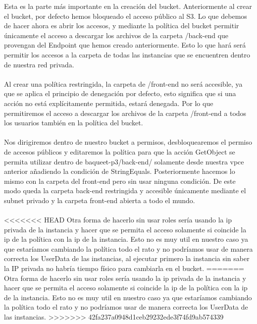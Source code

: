 \documentclass{article}
\begin{document}
	Esta es la parte más importante en la creación del bucket. Anteriormente al crear el bucket, por defecto hemos bloqueado el acceso público al S3. Lo que debemos de hacer ahora es abrir los accesos, y mediante la política del bucket permitir únicamente el acceso a descargar los archivos de la carpeta /back-end que provengan del Endpoint que hemos creado anteriormente. Esto lo que hará será permitir los accesos a la carpeta de todas las instancias que se encuentren dentro de nuestra red privada. 
	\\\\
	Al crear una política restringida, la carpeta de /front-end no será accesible, ya que se aplica el principio de denegación por defecto, esto significa que si una acción no está explícitamente permitida, estará denegada. Por lo que permitiremos el acceso a descargar los archivos de la carpeta /front-end a todos los usuarios también en la política del bucket.
	\\\\
	Nos dirigiremos dentro de nuestro bucket a permisos, desbloquearemos el permiso de accesos públicos y editaremos la política para que la acción GetObject se permita utilizar dentro de baqueet-p3/back-end/ solamente desde nuestra vpce anterior añadiendo la condición de StringEquals. Posteriormente hacemos lo mismo con la carpeta del front-end pero sin usar ninguna condición. De este modo queda la carpeta back-end restringida y accesible únicamente mediante el subnet privado y la carpeta front-end abierta a todo el mundo.
	\\\\
<<<<<<< HEAD
	Otra forma de hacerlo sin usar roles sería usando la ip privada de la instancia y hacer que se permita el acceso solamente si coincide la ip de la política con la ip de la instancia. Esto no es muy util en nuestro caso ya que estaríamos cambiando la política todo el rato y no podríamos usar de manera correcta los UserData de las instancias, al ejecutar primero la instancia sin saber la IP privada no habría tiempo físico para cambiarla en el bucket. 
=======
	Otra forma de hacerlo sin usar roles sería usando la ip privada de la instancia y hacer que se permita el acceso solamente si coincide la ip de la política con la ip de la instancia. Esto no es muy util en nuestro caso ya que estaríamos cambiando la política todo el rato y no podríamos usar de manera correcta los UserData de las instancias.
>>>>>>> 42fa237a0948d1ceb29232ede3f74fd9ab574339


	
\end{document}

